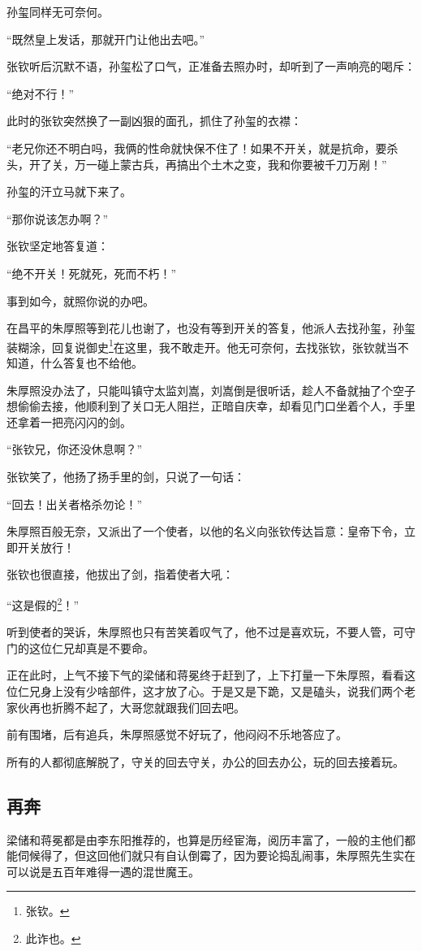 \begin{multicols}{\theparacolNo}
		孙玺同样无可奈何。

		“既然皇上发话，那就开门让他出去吧。”

		张钦听后沉默不语，孙玺松了口气，正准备去照办时，却听到了一声响亮的喝斥：

		“绝对不行！”

		此时的张钦突然换了一副凶狠的面孔，抓住了孙玺的衣襟：

		“老兄你还不明白吗，我俩的性命就快保不住了！如果不开关，就是抗命，要杀头，开了关，万一碰上蒙古兵，再搞出个土木之变，我和你要被千刀万剐！”

		孙玺的汗立马就下来了。

		“那你说该怎办啊？”

		张钦坚定地答复道：

		“绝不开关！死就死，死而不朽！”

		事到如今，就照你说的办吧。

		在昌平的朱厚照等到花儿也谢了，也没有等到开关的答复，他派人去找孙玺，孙玺装糊涂，回复说御史\footnote{张钦。}在这里，我不敢走开。他无可奈何，去找张钦，张钦就当不知道，什么答复也不给他。

		朱厚照没办法了，只能叫镇守太监刘嵩，刘嵩倒是很听话，趁人不备就抽了个空子想偷偷去接，他顺利到了关口无人阻拦，正暗自庆幸，却看见门口坐着个人，手里还拿着一把亮闪闪的剑。

		“张钦兄，你还没休息啊？”

		张钦笑了，他扬了扬手里的剑，只说了一句话：

		“回去！出关者格杀勿论！”

		朱厚照百般无奈，又派出了一个使者，以他的名义向张钦传达旨意：皇帝下令，立即开关放行！

		张钦也很直接，他拔出了剑，指着使者大吼：

		“这是假的\footnote{此诈也。}！”

		听到使者的哭诉，朱厚照也只有苦笑着叹气了，他不过是喜欢玩，不要人管，可守门的这位仁兄却真是不要命。

		正在此时，上气不接下气的梁储和蒋冕终于赶到了，上下打量一下朱厚照，看看这位仁兄身上没有少啥部件，这才放了心。于是又是下跪，又是磕头，说我们两个老家伙再也折腾不起了，大哥您就跟我们回去吧。

		前有围堵，后有追兵，朱厚照感觉不好玩了，他闷闷不乐地答应了。

		所有的人都彻底解脱了，守关的回去守关，办公的回去办公，玩的回去接着玩。

		\subsection{再奔}
		梁储和蒋冕都是由李东阳推荐的，也算是历经宦海，阅历丰富了，一般的主他们都能伺候得了，但这回他们就只有自认倒霉了，因为要论捣乱闹事，朱厚照先生实在可以说是五百年难得一遇的混世魔王。


\end{multicols}
